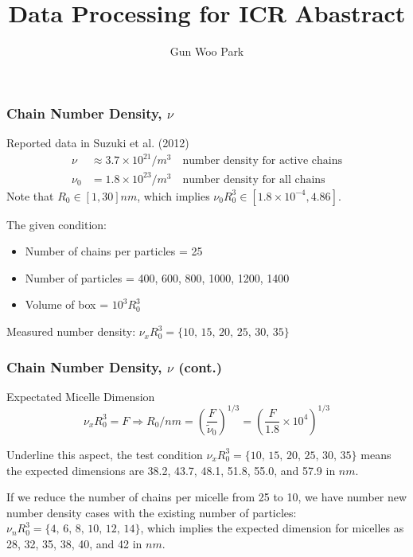 \documentclass[slidestop, compress, mathserif]{beamer}
\begin{document}
\title{Data Processing for ICR Abastract}
\author{Gun Woo Park}

\begin{frame}[plain]
\maketitle
\end{frame}

\begin{frame}
  \frametitle<presentation>{Chain Number Density, $\nu$}
  \begin{block}{Reported data in Suzuki et al. (2012)}
    \begin{align}
      \nu &\approx 3.7 \times 10^{21}/m^3 \quad\textrm{number density for active chains}\\
      \nu_0 &= 1.8 \times 10^{23}/m^3\quad\textrm{number density for all chains}
    \end{align}
    Note that $R_0 \in [1, 30]nm$, which implies $\nu_0R_0^3 \in [1.8\times 10^{-4}, 4.86]$.
  \end{block}
  The given condition:
  \begin{itemize}
    \item Number of chains per particles = 25
    \item Number of particles = 400, 600, 800, 1000, 1200, 1400
    \item Volume of box = $10^{3}R_0^3$
  \end{itemize}
  Measured number density: $\nu_xR_0^3 = \{10,\, 15,\, 20,\, 25,\, 30,\, 35\}$
\end{frame}

\begin{frame}
  \frametitle<presentation>{Chain Number Density, $\nu$ (cont.)}
  \begin{block}{Expectated Micelle Dimension}
  \begin{equation}
    \nu_{x} R_0^3 = F \Rightarrow R_0/nm = \left(\frac{F}{\tilde{\nu}_0}\right)^{1/3} = \left(\frac{F}{1.8}\times 10^{4}\right)^{1/3}
  \end{equation}
  \end{block}
  Underline this aspect, the test condition $\nu_xR_0^3 = \{10,\, 15,\, 20,\, 25,\, 30,\, 35\}$ means the expected dimensions are 38.2, 43.7, 48.1, 51.8, 55.0, and 57.9 in $nm$.

  If we reduce the number of chains per micelle from 25 to 10, we have number new number density cases with the existing number of particles: $\nu_nR_0^3 = \{4,\, 6,\, 8,\, 10,\, 12,\, 14\}$, which implies the expected dimension for micelles as 28, 32, 35, 38, 40, and 42 in $nm$.

\end{frame}
\end{document}
